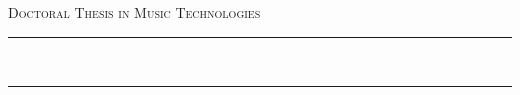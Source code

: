 
\thispagestyle{empty}

\begin{flushright}
    {\normalsize \textsc{\href{http://www.sussex.ac.uk/}{\myUni}} \\} %
    {\normalsize \textsc{\myFaculty} \\} %
    {\normalsize \textsc{\myDepartment} \\} %
    {\normalsize \textsc{\myCenter} \\} %
\end{flushright}
\begin{flushleft}
    
        {\Large \textsc{Doctoral Thesis in Music Technologies}}\par
        
        {\rule{\linewidth}{1pt}\\%
        \Large \myTitle \par %
        \normalsize \mySubtitle \par
        \Large \myName \par} %
        \rule{\linewidth}{1pt}\\[0.4cm]
        
\end{flushleft}


    
